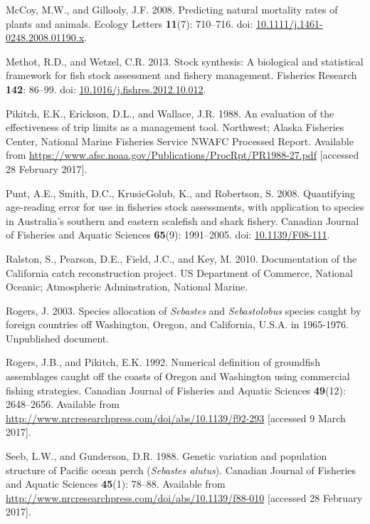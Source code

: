 \documentclass[12pt,]{article}
\begin{document}
\hypertarget{ref-mccoy_predicting_2008}{}
McCoy, M.W., and Gillooly, J.F. 2008. Predicting natural mortality rates
of plants and animals. Ecology Letters \textbf{11}(7): 710--716. doi:
\href{https://doi.org/10.1111/j.1461-0248.2008.01190.x}{10.1111/j.1461-0248.2008.01190.x}.

\hypertarget{ref-methot_stock_2013}{}
Methot, R.D., and Wetzel, C.R. 2013. Stock synthesis: A biological and
statistical framework for fish stock assessment and fishery management.
Fisheries Research \textbf{142}: 86--99. doi:
\href{https://doi.org/10.1016/j.fishres.2012.10.012}{10.1016/j.fishres.2012.10.012}.

\hypertarget{ref-pikitch_evaluation_1988}{}
Pikitch, E.K., Erickson, D.L., and Wallace, J.R. 1988. An evaluation of
the effectiveness of trip limits as a management tool. Northwest; Alaska
Fisheries Center, National Marine Fisheries Service NWAFC Processed
Report. Available from
\url{https://www.afsc.noaa.gov/Publications/ProcRpt/PR1988-27.pdf}
{[}accessed 28 February 2017{]}.

\hypertarget{ref-punt_quantifying_2008}{}
Punt, A.E., Smith, D.C., KrusicGolub, K., and Robertson, S. 2008.
Quantifying age-reading error for use in fisheries stock assessments,
with application to species in Australia's southern and eastern
scalefish and shark fishery. Canadian Journal of Fisheries and Aquatic
Sciences \textbf{65}(9): 1991--2005. doi:
\href{https://doi.org/10.1139/F08-111}{10.1139/F08-111}.

\hypertarget{ref-ralston_documentation_2010}{}
Ralston, S., Pearson, D.E., Field, J.C., and Key, M. 2010. Documentation
of the California catch reconstruction project. US Department of
Commerce, National Oceanic; Atmospheric Adminstration, National Marine.

\hypertarget{ref-rogers_species_2003}{}
Rogers, J. 2003. Species allocation of \emph{Sebastes} and
\emph{Sebastolobus} species caught by foreign countries off Washington,
Oregon, and California, U.S.A. in 1965-1976. Unpublished document.

\hypertarget{ref-rogers_numerical_1992}{}
Rogers, J.B., and Pikitch, E.K. 1992. Numerical definition of groundfish
assemblages caught off the coasts of Oregon and Washington using
commercial fishing strategies. Canadian Journal of Fisheries and Aquatic
Sciences \textbf{49}(12): 2648--2656. Available from
\url{http://www.nrcresearchpress.com/doi/abs/10.1139/f92-293}
{[}accessed 9 March 2017{]}.

\hypertarget{ref-seeb_genetic_1988}{}
Seeb, L.W., and Gunderson, D.R. 1988. Genetic variation and population
structure of Pacific ocean perch (\emph{Sebastes alutus}). Canadian
Journal of Fisheries and Aquatic Sciences \textbf{45}(1): 78--88.
Available from
\url{http://www.nrcresearchpress.com/doi/abs/10.1139/f88-010}
{[}accessed 28 February 2017{]}.
\end{document}
